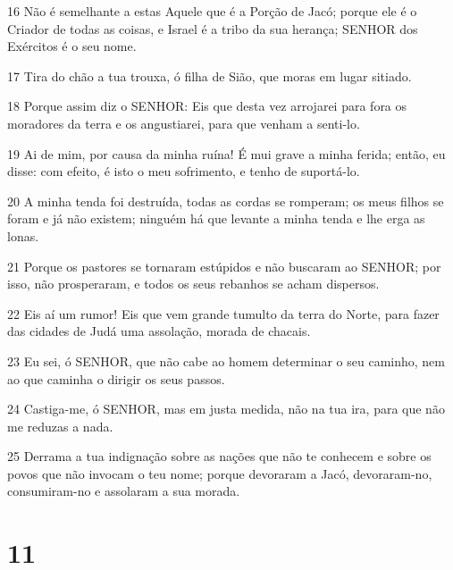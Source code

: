 \par 16 Não é semelhante a estas Aquele que é a Porção de Jacó; porque ele é o Criador de todas as coisas, e Israel é a tribo da sua herança; SENHOR dos Exércitos é o seu nome.
\par 17 Tira do chão a tua trouxa, ó filha de Sião, que moras em lugar sitiado.
\par 18 Porque assim diz o SENHOR: Eis que desta vez arrojarei para fora os moradores da terra e os angustiarei, para que venham a senti-lo.
\par 19 Ai de mim, por causa da minha ruína! É mui grave a minha ferida; então, eu disse: com efeito, é isto o meu sofrimento, e tenho de suportá-lo.
\par 20 A minha tenda foi destruída, todas as cordas se romperam; os meus filhos se foram e já não existem; ninguém há que levante a minha tenda e lhe erga as lonas.
\par 21 Porque os pastores se tornaram estúpidos e não buscaram ao SENHOR; por isso, não prosperaram, e todos os seus rebanhos se acham dispersos.
\par 22 Eis aí um rumor! Eis que vem grande tumulto da terra do Norte, para fazer das cidades de Judá uma assolação, morada de chacais.
\par 23 Eu sei, ó SENHOR, que não cabe ao homem determinar o seu caminho, nem ao que caminha o dirigir os seus passos.
\par 24 Castiga-me, ó SENHOR, mas em justa medida, não na tua ira, para que não me reduzas a nada.
\par 25 Derrama a tua indignação sobre as nações que não te conhecem e sobre os povos que não invocam o teu nome; porque devoraram a Jacó, devoraram-no, consumiram-no e assolaram a sua morada.

\chapter{11}

